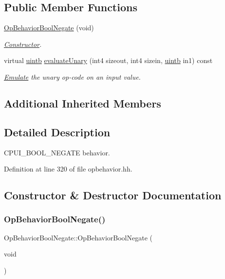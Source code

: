 \subsection*{Public Member Functions}
\begin{DoxyCompactItemize}
\item 
\mbox{\hyperlink{class_op_behavior_bool_negate_ad989579c4dc7e3f56885e382539998c9}{Op\+Behavior\+Bool\+Negate}} (void)
\begin{DoxyCompactList}\small\item\em \mbox{\hyperlink{class_constructor}{Constructor}}. \end{DoxyCompactList}\item 
virtual \mbox{\hyperlink{types_8h_a2db313c5d32a12b01d26ac9b3bca178f}{uintb}} \mbox{\hyperlink{class_op_behavior_bool_negate_a40382967373ce9b2720956e8ca38b5e2}{evaluate\+Unary}} (int4 sizeout, int4 sizein, \mbox{\hyperlink{types_8h_a2db313c5d32a12b01d26ac9b3bca178f}{uintb}} in1) const
\begin{DoxyCompactList}\small\item\em \mbox{\hyperlink{class_emulate}{Emulate}} the unary op-\/code on an input value. \end{DoxyCompactList}\end{DoxyCompactItemize}
\subsection*{Additional Inherited Members}


\subsection{Detailed Description}
C\+P\+U\+I\+\_\+\+B\+O\+O\+L\+\_\+\+N\+E\+G\+A\+TE behavior. 

Definition at line 320 of file opbehavior.\+hh.



\subsection{Constructor \& Destructor Documentation}
\mbox{\label{class_op_behavior_bool_negate_ad989579c4dc7e3f56885e382539998c9}} 
\subsubsection{\texorpdfstring{OpBehaviorBoolNegate()}{OpBehaviorBoolNegate()}}
{\footnotesize\ttfamily Op\+Behavior\+Bool\+Negate\+::\+Op\+Behavior\+Bool\+Negate (\begin{DoxyParamCaption}\item[{void}]{ }\end{DoxyParamCaption})\hspace{0.3cm}{\ttfamily [inline]}}



